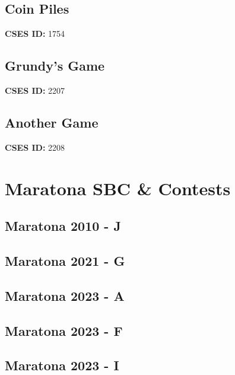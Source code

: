 \documentclass[10pt, a4paper, twocolumn, landscape]{article}
\begin{document}
\subsection{Coin Piles}
\textbf{CSES ID:} 1754 \\

\vspace{0.2cm}
\subsection{Grundy's Game}
\textbf{CSES ID:} 2207 \\

\vspace{0.2cm}
\subsection{Another Game}
\textbf{CSES ID:} 2208 \\

\vspace{0.2cm}
\section{Maratona SBC \& Contests}
\subsection{Maratona 2010 - J}

\vspace{0.2cm}
\subsection{Maratona 2021 - G}

\vspace{0.2cm}
\subsection{Maratona 2023 - A}

\vspace{0.2cm}
\subsection{Maratona 2023 - F}

\vspace{0.2cm}
\subsection{Maratona 2023 - I}

\vspace{0.2cm}
\end{document}
